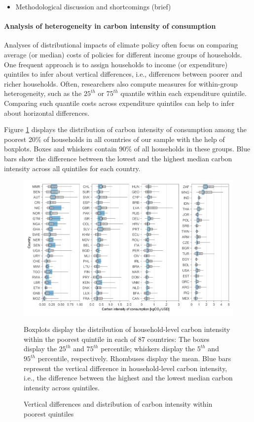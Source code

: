 \documentclass[12pt, a4paper]{article}
\newenvironment{subcaption}
{\strut
\vspace{-5pt}
\begin{minipage}[b]{0.9\textwidth}
  \hspace*{-\parindent}
  \footnotesize}
 {\end{minipage}}
\begin{document}
\begin{itemize}
    \item Methodological discussion and shortcomings (brief)
\end{itemize}

\paragraph{Analysis of heterogeneity in carbon intensity of consumption}


Analyses of distributional impacts of climate policy often focus on comparing average (or median) costs of policies for different income groups of households. One frequent approach is to assign households to income (or expenditure) quintiles to infer about vertical differences, i.e., differences between poorer and richer households. Often, researchers also compute measures for within-group heterogeneity, such as the $25^{th}$ or $75^{th}$ quantile within each expenditure quintile. Comparing such quantile costs across expenditure quintiles can help to infer about horizontal differences.

Figure \ref{fig:fig_1} displays the distribution of carbon intensity of consumption among the poorest 20\% of households in all countries of our sample with the help of boxplots. Boxes and whiskers contain 90\% of all households in these groups. Blue bars show the difference between the lowest and the highest median carbon intensity across all quintiles for each country.

\begin{figure}[ht!]
    \centering
    \includegraphics{Figure 1/Figure_1}
    \caption{Vertical differences and distribution of carbon intensity within poorest quintiles}
    \label{fig:fig_1}
    \begin{subcaption}
    Boxplots display the distribution of household-level carbon intensity within the poorest quintile in each of 87 countries: The boxes display the $25^{th}$ and $75^{th}$ percentile; whiskers display the $5^{th}$ and $95^{th}$ percentile, respectively. Rhombuses display the mean. Blue bars represent the vertical difference in household-level carbon intensity, i.e., the difference between the highest and the lowest median carbon intensity across quintiles.
    \end{subcaption}
\end{figure}
\end{document}
